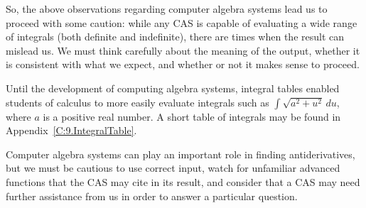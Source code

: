 So, the above observations regarding computer algebra systems lead us to proceed with some caution:  while any CAS is capable of evaluating a wide range of integrals (both definite and indefinite), there are times when the result can mislead us.  We must think carefully about the meaning of the output, whether it is consistent with what we expect, and whether or not it makes sense to proceed.


\vspace*{-.8cm}

\begin{summary}
\item Until the development of computing algebra systems, integral tables enabled students of calculus to more easily evaluate integrals such as $\int \sqrt{a^2 + u^2} \, du$, where $a$ is a positive real number.  A short table of integrals may be found in Appendix~\ref{C:9.IntegralTable}.
\item Computer algebra systems can play an important role in finding antiderivatives, but we must be cautious to use correct input, watch for unfamiliar advanced functions that the CAS may cite in its result, and consider that a CAS may need further assistance from us in order to answer a particular question.
\end{summary}

\clearpage

 

\cleardoublepage
